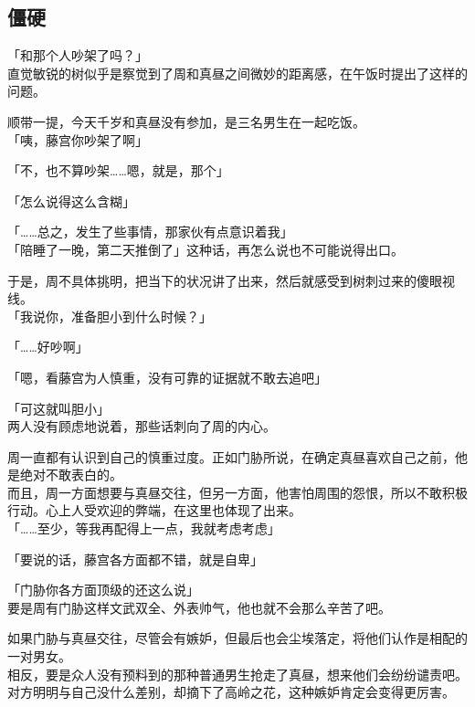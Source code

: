 \subsection{僵硬}

「和那个人吵架了吗？」\\

直觉敏锐的树似乎是察觉到了周和真昼之间微妙的距离感，在午饭时提出了这样的问题。

顺带一提，今天千岁和真昼没有参加，是三名男生在一起吃饭。\\

「咦，藤宫你吵架了啊」

「不，也不算吵架……嗯，就是，那个」

「怎么说得这么含糊」

「……总之，发生了些事情，那家伙有点意识着我」\\

「陪睡了一晚，第二天推倒了」这种话，再怎么说也不可能说得出口。

于是，周不具体挑明，把当下的状况讲了出来，然后就感受到树刺过来的傻眼视线。\\

「我说你，准备胆小到什么时候？」

「……好吵啊」

「嗯，看藤宫为人慎重，没有可靠的证据就不敢去追吧」

「可这就叫胆小」\\

两人没有顾虑地说着，那些话刺向了周的内心。

周一直都有认识到自己的慎重过度。正如门胁所说，在确定真昼喜欢自己之前，他是绝对不敢表白的。\\

而且，周一方面想要与真昼交往，但另一方面，他害怕周围的怨恨，所以不敢积极行动。心上人受欢迎的弊端，在这里也体现了出来。\\

「……至少，等我再配得上一点，我就考虑考虑」

「要说的话，藤宫各方面都不错，就是自卑」

「门胁你各方面顶级的还这么说」\\

要是周有门胁这样文武双全、外表帅气，他也就不会那么辛苦了吧。

如果门胁与真昼交往，尽管会有嫉妒，但最后也会尘埃落定，将他们认作是相配的一对男女。\\

相反，要是众人没有预料到的那种普通男生抢走了真昼，想来他们会纷纷谴责吧。对方明明与自己没什么差别，却摘下了高岭之花，这种嫉妒肯定会变得更厉害。\\

